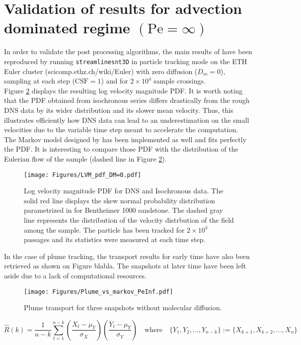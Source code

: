 \section{Validation of \cite{Meyer2016} results for advection dominated regime $(\mathrm{Pe}=\infty)$}
In order to validate the post processing algorithms, the main results of \cite{Meyer2016} have been reproduced by running \texttt{streamlinesnt3D} in particle tracking mode on the ETH Euler cluster (scicomp.ethz.ch/wiki/Euler) with zero diffusion ($D_m=0$), sampling at each step ($\mathrm{CSF}=1$) and for $2\times 10^4$ sample crossings.\\ 
Figure \ref{fig:lvm_pdf_peinf} displays the resulting log velocity magnitude PDF. 
It is worth noting that the PDF obtained from isochronous series differs drastically from the rough DNS data by its wider distribution and its slower mean velocity.
Thus, this illustrates efficiently how DNS data can lead to an underestimation on the small velocities due to the variable time step meant to accelerate the computation.\\
The Markov model designed by \cite{Meyer2016} has been implemented as well and fits perfectly the PDF.
It is interesting to compare those PDF with the distribution of the Eulerian flow of the sample (dashed line in Figure \ref{fig:lvm_pdf_peinf}).
\begin{figure}
	\centering
	\texttt{[image: Figures/LVM\_pdf\_DM=0.pdf]}
	\caption{Log velocity magnitude PDF for DNS and Isochronous data. The solid red line displays the skew normal probability distribution parametrized in \citet{Meyer2016} for Bentheimer 1000 sandstone. The dashed gray line represents the distribution of the velocity distrbution of the field among the sample. The particle has been tracked for $2\times 10^4$ passages and its statistics were measured at each time step.}
	\label{fig:lvm_pdf_peinf}
\end{figure}

In the case of plume tracking, the transport results for early time have also been retrieved as shown on Figure blabla. The snapshots at later time have been left aside due to a lack of computational resources.

\begin{figure}
	\centering
	\texttt{[image: Figures/Plume\_vs\_markov\_PeInf.pdf]}
	\caption{Plume transport for three snapshots without molecular diffusion.}
	\label{fig:lvm_pdf_peinf}
\end{figure}

$$
\hat R(k) = \frac{1}{n-k} \sum_{t=1}^{n-k} \left(\frac{X_t-\mu_Y}{\sigma_X}\right)\left(\frac{Y_t-\mu_Y}{\sigma_Y}\right) \quad\textrm{where}\quad \{Y_1,Y_2,...,Y_{n-k}\} := \{X_{k+1},X_{k+2},...,X_{n}\} 
$$

